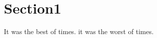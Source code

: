 \documentclass[main.tex]{subfiles} %
\begin{document}
	\section{Section1}
	It was the best of times. it was the worst of times.
\end{document}
